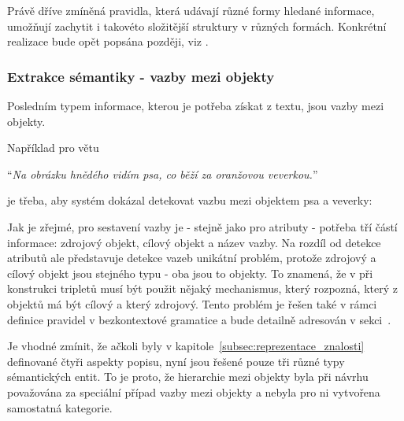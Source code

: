 Právě dříve zmíněná pravidla, která udávají různé formy hledané informace, umožňují zachytit i takovéto složitější struktury v různých formách.
Konkrétní realizace bude opět popsána později, viz .

\newpage
\subsubsection{Extrakce sémantiky - vazby mezi objekty}
Posledním typem informace, kterou je potřeba získat z textu, jsou vazby mezi objekty.

Například pro větu
\begin{center}
	\enquote{\emph{Na obrázku hnědého vidím psa, co běží za oranžovou veverkou.}}
\end{center}
je třeba, aby systém dokázal detekovat vazbu mezi objektem psa a veverky:
\begin{center}
\end{center}

Jak je zřejmé, pro sestavení vazby je - stejně jako pro atributy - potřeba tří částí informace: zdrojový objekt, cílový objekt a název vazby.
Na rozdíl od detekce atributů ale představuje detekce vazeb unikátní problém, protože zdrojový a cílový objekt jsou stejného typu - oba jsou to objekty.
To znamená, že v při konstrukci tripletů musí být použit nějaký mechanismus, který rozpozná, který z objektů má být cílový a který zdrojový.
Tento problém je řešen také v rámci definice pravidel v bezkontextové gramatice a bude detailně adresován v sekci~.

Je vhodné zmínit, že ačkoli byly v kapitole~\ref{subsec:reprezentace_znalosti} definované čtyři aspekty popisu,
nyní jsou řešené pouze tři různé typy sémantických entit.
To je proto, že hierarchie mezi objekty byla při návrhu považována za speciální případ vazby mezi objekty a nebyla pro ni vytvořena samostatná kategorie.
